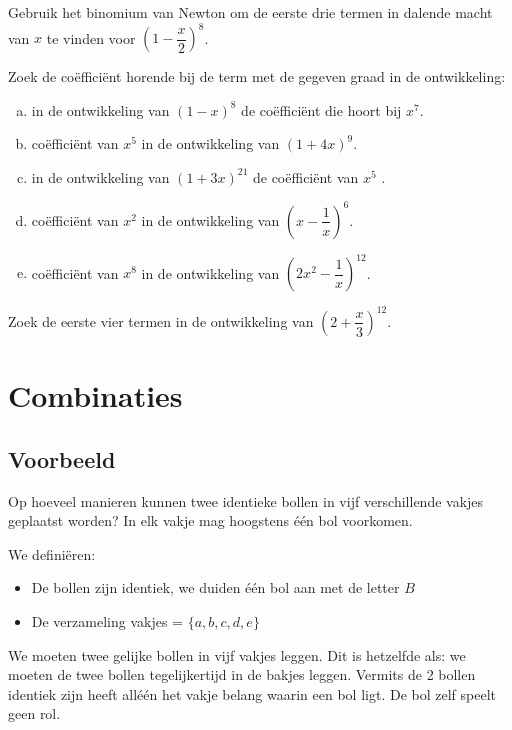 \documentclass[12pt,a4,twoside]{article}
\begin{document}
\begin{oefening}
Gebruik het binomium van Newton om de eerste drie termen in dalende macht van $x$ te vinden voor $\left(1-\dfrac{x}{2}\right)^8$.
\end{oefening}

\begin{oefening}
Zoek de coëfficiënt horende bij de term met de gegeven graad in de ontwikkeling:
\begin{enumerate}[(a)]
  \item in de ontwikkeling van $\left(1-x\right)^8$ de coëfficiënt die hoort bij $x^7$.
  \item coëfficiënt van $x^5$ in de ontwikkeling van $\left(1+4x\right)^9$.
  \item in de ontwikkeling van $\left(1+3x\right)^{21}$ de coëfficiënt van $x^5$ .
  \item coëfficiënt van $x^2$ in de ontwikkeling van $\left(x-\dfrac{1}{x}\right)^6$.
  \item coëfficiënt van $x^8$ in de ontwikkeling van $\left(2x^2-\dfrac{1}{x}\right)^{12}$.
\end{enumerate}
\end{oefening}

\begin{oefening}
Zoek de eerste vier termen in de ontwikkeling van $\left(2+\dfrac{x}{3}\right)^{12}$.
\end{oefening}

\pagebreak
\section{Combinaties}

\subsection{Voorbeeld}

Op hoeveel manieren kunnen twee identieke bollen in vijf verschillende vakjes geplaatst worden? In elk vakje mag hoogstens één bol voorkomen.

We definiëren:
\begin{itemize}
  \item De bollen zijn identiek, we duiden één bol aan met de letter $B$
  \item De verzameling vakjes = $\{a, b, c, d, e\}$
\end{itemize}

We moeten twee gelijke bollen in vijf vakjes leggen. Dit is hetzelfde als: we moeten de twee bollen tegelijkertijd in de bakjes leggen. Vermits de 2 bollen identiek zijn heeft alléén het vakje belang waarin een bol ligt. De bol zelf speelt geen rol.
\end{document}
